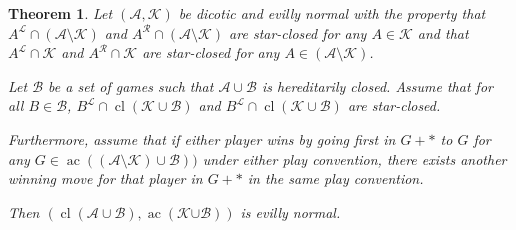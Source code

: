 \documentclass[10pt,a4paper]{amsart}
\newtheorem{thm}{Theorem}
\DeclareMathOperator{\ac}{ac}
\DeclareMathOperator{\cl}{cl}
\begin{document}
\begin{thm}
\label{add to a- (a-k)}
   Let $(\mathscr{A},\mathscr{K})$ be dicotic and evilly normal with the property that $A^\mathcal{L} \cap (\mathscr{A}\setminus\mathscr{K})$ and $A^\mathcal{R} \cap (\mathscr{A}\setminus\mathscr{K})$ are star-closed for any $A \in \mathscr{K}$ and that $A^{\mathcal{L}}\cap \mathscr{K}$ and $A^{\mathcal{R}}\cap \mathscr{K}$ are star-closed for any $A \in (\mathscr{A} \setminus \mathscr{K})$.
    
Let $\mathscr{B}$ be a set of games such that $\mathscr{A} \cup \mathscr{B}$ is hereditarily closed. Assume that for all $B \in \mathscr{B}$, $B^\mathcal{L{}} \cap \cl(\mathscr{K} \cup \mathscr{B})$ and $B^\mathcal{L{}} \cap \cl(\mathscr{K} \cup \mathscr{B})$ are star-closed.

Furthermore, assume that if either player wins by going first in $G+*$ to $G$ for any $G\in \ac( (\mathscr{A}\setminus \mathscr{K} )\cup \mathscr{B})) $ under either play convention, there exists another winning move for that player in $G+*$ in the same play convention.
   
   Then $(\cl(\mathscr{A}\cup \mathscr{B}), \ac(\mathscr{K{ \cup \mathscr{B}}}))$ is evilly normal.
\end{thm}
\end{document}
